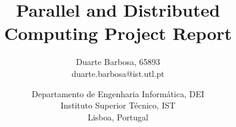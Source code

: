 \documentclass[times, 10pt,twocolumn]{article}
\begin{document}
\title{Parallel and Distributed Computing Project Report}

\author{
Duarte Barbosa, 65893\\
duarte.barbosa@ist.utl.pt\\
\and
Departamento de Engenharia Informática, DEI\\
Instituto Superior Técnico, IST\\
Lisboa, Portugal\\
}

\maketitle
\thispagestyle{empty}
\end{document}
